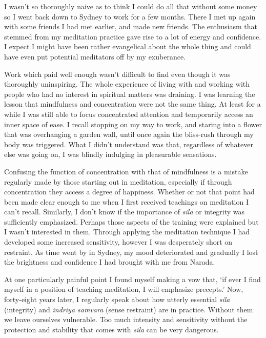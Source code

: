 I wasn't so thoroughly naive as to think I could do all that without
some money so I went back down to Sydney to work for a few months. There
I met up again with some friends I had met earlier, and made new
friends. The enthusiasm that stemmed from my meditation practice gave
rise to a lot of energy and confidence. I expect I might have been
rather evangelical about the whole thing and could have even put
potential meditators off by my exuberance.

Work which paid well enough wasn't difficult to find even though it was
thoroughly uninspiring. The whole experience of living with and working
with people who had no interest in spiritual matters was draining. I was
learning the lesson that mindfulness and concentration were not the same
thing. At least for a while I was still able to focus concentrated
attention and temporarily access an inner space of ease. I recall
stopping on my way to work, and staring into a flower that was
overhanging a garden wall, until once again the bliss-rush through my
body was triggered. What I didn't understand was that, regardless of
whatever else was going on, I was blindly indulging in pleasurable
sensations.

Confusing the function of concentration with that of mindfulness is a
mistake regularly made by those starting out in meditation, especially
if through concentration they access a degree of happiness. Whether or
not that point had been made clear enough to me when I first received
teachings on meditation I can't recall. Similarly, I don't know if the
importance of \emph{sila} or integrity was sufficiently emphasized.
Perhaps those aspects of the training were explained but I wasn't
interested in them. Through applying the meditation technique I had
developed some increased sensitivity, however I was desperately short on
restraint. As time went by in Sydney, my mood deteriorated and gradually
I lost the brightness and confidence I had brought with me from Narada.

At one particularly painful point I found myself making a vow that, `if
ever I find myself in a position of teaching meditation, I will
emphasize precepts.' Now, forty-eight years later,
I regularly speak about how utterly essential \emph{sila} (integrity)
and \emph{indriya samvara} (sense restraint) are in practice. Without
them we leave ourselves vulnerable. Too much intensity and sensitivity
without the protection and stability that comes with \emph{sila} can be
very dangerous.

